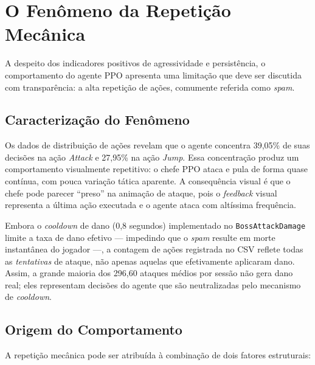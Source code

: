 \section{O Fenômeno da Repetição Mecânica}
\label{sec:repeticao-mecanica}

A despeito dos indicadores positivos de agressividade e persistência, o
comportamento do agente PPO apresenta uma limitação que deve ser discutida com
transparência: a alta repetição de ações, comumente referida como
\textit{spam}.

\subsection{Caracterização do Fenômeno}
\label{subsec:caracterizacao-spam}

Os dados de distribuição de ações revelam que o agente concentra 39,05\%
de suas decisões na ação \textit{Attack} e 27,95\% na ação \textit{Jump}.
Essa concentração produz um comportamento visualmente repetitivo: o chefe PPO
ataca e pula de forma quase contínua, com pouca variação tática aparente. A
consequência visual é que o chefe pode parecer ``preso'' na animação de
ataque, pois o \textit{feedback} visual representa a última ação executada e
o agente ataca com altíssima frequência.

Embora o \textit{cooldown} de dano (0,8 segundos) implementado no
\texttt{BossAttackDamage} limite a taxa de dano efetivo --- impedindo que o
\textit{spam} resulte em morte instantânea do jogador ---, a contagem de ações
registrada no CSV reflete todas as \textit{tentativas} de ataque, não apenas
aquelas que efetivamente aplicaram dano. Assim, a grande maioria dos 296,60
ataques médios por sessão não gera dano real; eles representam decisões do
agente que são neutralizadas pelo mecanismo de \textit{cooldown}.

\subsection{Origem do Comportamento}
\label{subsec:origem-comportamento}

A repetição mecânica pode ser atribuída à combinação de dois fatores
estruturais:


